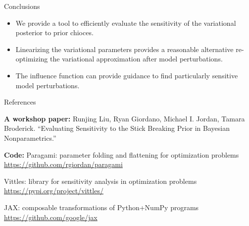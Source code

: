 \begin{frame}{Conclusions}

\begin{itemize}
\item We provide a tool to efficiently evaluate the sensitivity of the variational posterior to prior chioces.
\item Linearizing the variational parameters provides a reasonable alternative
re-optimizing the variational approximation
after model perturbations.
\item The influence function can provide guidance to find particularly sensitive model perturbations.
\end{itemize}

\end{frame}


\begin{frame}{References}

{\bf A workshop paper: }\newline
Runjing Liu, Ryan Giordano, Michael I. Jordan, Tamara Broderick. \newline
“Evaluating Sensitivity to the Stick Breaking Prior in Bayesian Nonparametrics.”

\vspace{1em}

{\bf Code: }\newline
Paragami: parameter folding and flattening for optimization problems \newline
{\color{blue}\url{https://github.com/rgiordan/paragami}}

Vittles: library for sensitivity analysis in optimization problems \newline
{\color{blue}\url{https://pypi.org/project/vittles/}}

JAX: composable transformations of Python+NumPy programs \newline
{\color{blue}\url{https://github.com/google/jax}}


\end{frame}
